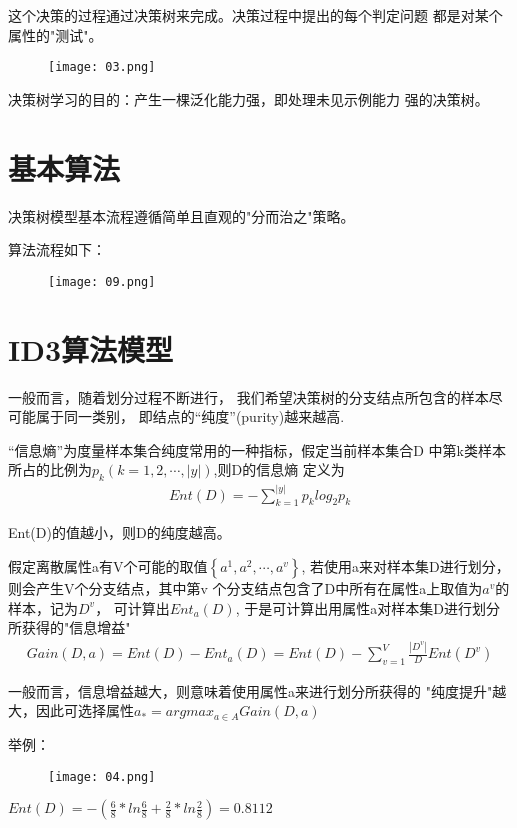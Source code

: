\documentclass[12pt]{article}
\begin{document}
这个决策的过程通过决策树来完成。决策过程中提出的每个判定问题
都是对某个属性的"测试"。
\begin{figure}[htbp]
	\centering
	\texttt{[image: 03.png]}
\end{figure}

决策树学习的目的：产生一棵泛化能力强，即处理未见示例能力
强的决策树。


\newpage

\section{基本算法}
决策树模型基本流程遵循简单且直观的"分而治之"策略。

算法流程如下：
\begin{figure}[H]
	\centering
	\texttt{[image: 09.png]}
\end{figure}

\section{ID3算法模型}
一般而言，随着划分过程不断进行，
我们希望决策树的分支结点所包含的样本尽可能属于同一类别，
即结点的“纯度”(purity)越来越高.

“信息熵”为度量样本集合纯度常用的一种指标，假定当前样本集合D
中第k类样本所占的比例为$p_k(k=1,2,\cdots,|y|)$,则D的信息熵
定义为
\begin{align}
	Ent(D)=-\sum_{k = 1}^{|y|}p_klog_2p_k  
\end{align}

Ent(D)的值越小，则D的纯度越高。

假定离散属性a有V个可能的取值$\left\{a^1,a^2,\cdots,a^v \right\}$,
若使用a来对样本集D进行划分，则会产生V个分支结点，其中第v
个分支结点包含了D中所有在属性a上取值为$a^v$的样本，记为$D^v$，
可计算出$Ent_a(D)$,
于是可计算出用属性a对样本集D进行划分所获得的"信息增益"
\begin{align}
	Gain(D,a)=Ent(D)-Ent_a(D)=Ent(D)-\sum_{v = 1}^{V}\frac{|D^v|}{D}Ent(D^v) 
\end{align}

一般而言，信息增益越大，则意味着使用属性a来进行划分所获得的
"纯度提升"越大，因此可选择属性$a_\ast =arg max_{a\in A} Gain(D,a)$

举例：
\begin{figure}[H]
	\centering
	\texttt{[image: 04.png]}
\end{figure}

$Ent(D)=-(\frac{6}{8}*ln\frac{6}{8}+\frac{2}{8}*ln\frac{2}{8})=0.8112$
\end{document}
